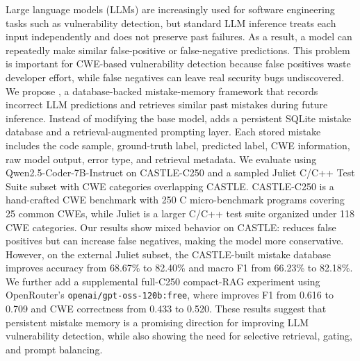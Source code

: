 Large language models (LLMs) are increasingly used for software engineering tasks such as vulnerability detection, but standard LLM inference treats each input independently and does not preserve past failures. As a result, a model can repeatedly make similar false-positive or false-negative predictions. This problem is important for CWE-based vulnerability detection because false positives waste developer effort, while false negatives can leave real security bugs undiscovered. We propose \system, a database-backed mistake-memory framework that records incorrect LLM predictions and retrieves similar past mistakes during future inference. Instead of modifying the base model, \system adds a persistent SQLite mistake database and a retrieval-augmented prompting layer. Each stored mistake includes the code sample, ground-truth label, predicted label, CWE information, raw model output, error type, and retrieval metadata. We evaluate \system using Qwen2.5-Coder-7B-Instruct on CASTLE-C250 and a sampled Juliet C/C++ Test Suite subset with CWE categories overlapping CASTLE. CASTLE-C250 is a hand-crafted CWE benchmark with 250 C micro-benchmark programs covering 25 common CWEs, while Juliet is a larger C/C++ test suite organized under 118 CWE categories. Our results show mixed behavior on CASTLE: \system reduces false positives but can increase false negatives, making the model more conservative. However, on the external Juliet subset, the CASTLE-built mistake database improves accuracy from 68.67\% to 82.40\% and macro F1 from 66.23\% to 82.18\%. We further add a supplemental full-C250 compact-RAG experiment using OpenRouter's \texttt{openai/gpt-oss-120b:free}, where \system improves F1 from 0.616 to 0.709 and CWE correctness from 0.433 to 0.520. These results suggest that persistent mistake memory is a promising direction for improving LLM vulnerability detection, while also showing the need for selective retrieval, gating, and prompt balancing.
